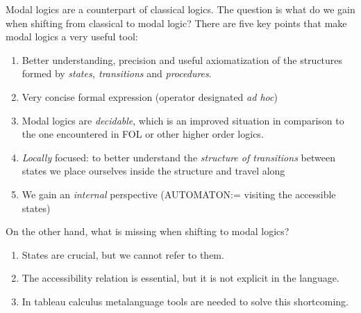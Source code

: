 Modal logics are a counterpart of classical logics. The question is what do
we gain when shifting from classical to modal logic? There are five key
points that make modal logics a very useful tool:

\begin{enumerate}
\item Better understanding, precision and useful axiomatization of the
structures formed by \emph{states, transitions} and \emph{procedures}.

\item Very concise formal expression (operator designated \emph{ad hoc})

\item Modal logics are \emph{decidable}, which is an improved situation in
comparison to the one encountered in FOL or other higher order logics.

\item \emph{Locally} focused: to better understand the \emph{structure of
transitions} between states we place ourselves inside the structure and
travel along

\item We gain an \emph{internal }perspective (AUTOMATON:= visiting the
accessible states)
\end{enumerate}

On the other hand, what is missing when shifting to modal logics?

\begin{enumerate}
\item States are crucial, but we cannot refer to them.

\item The accessibility relation is essential, but it is not explicit in the
language.

\item In tableau calculus metalanguage tools are needed to solve this
shortcoming.
\end{enumerate}

